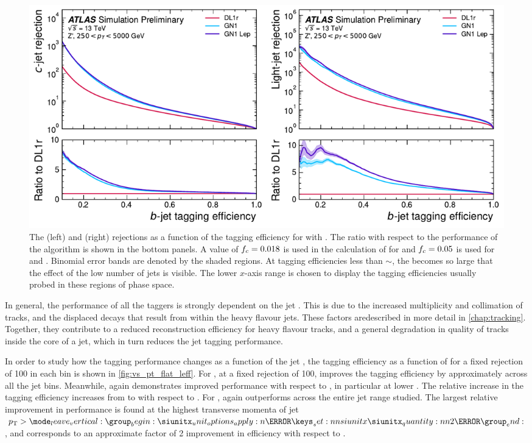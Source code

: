 \begin{figure}[!p]
    \centering
    \includegraphics[width=\textwidth]{chapters/gnn_tagger/figs/results/main/zprime/zprime_roc_btag.pdf}
    \caption{The \cjet (left) and \ljet (right) rejections as a function of the \bjet tagging efficiency for \Zprimejets with \Zprimept.
             The ratio with respect to the performance of the \DLr algorithm is shown in the bottom panels.
             A value of $f_c = 0.018$ is used in the calculation of \Db for \DLr and $f_c = 0.05$ is used for \GNN and \GNNLep.
             Binomial error bands are denoted by the shaded regions.
             At \bjet tagging efficiencies less than $\sim$, the \lrej becomes so large that the effect of the low number of jets is visible.
             The lower $x$-axis range is chosen to display the \bjet tagging efficiencies usually probed in these regions of phase space.}
    \label{fig:zprime_btag_roc}
\end{figure}

In general, the performance of all the taggers is strongly dependent on the jet \pt.
This is due to the increased multiplicity and collimation of tracks, and the displaced decays that result from within the heavy flavour jets.
These factors aredescribed in more detail in \cref{chap:tracking}.
Together, they contribute to a reduced reconstruction efficiency for heavy flavour tracks, and a general degradation in quality of tracks inside the core of a jet, which in turn reduces the jet tagging performance.

In order to study how the tagging performance changes as a function of the jet \pt, the \bjet tagging efficiency as a function of \pt for a fixed \ljet rejection of 100 in each bin is shown in \cref{fig:vs_pt_flat_leff}.
For \ttbarjets, at a fixed \ljet rejection of 100, \GNN improves the \bjet tagging efficiency by approximately  across all the jet \pt bins.
Meanwhile, \GNNLep again demonstrates improved performance with respect to \GNN, in particular at lower \pt.
The relative increase in the \bjet tagging efficiency increases from  to  with respect to \DLr.
For \Zprimejets, \GNN again outperforms \DLr across the entire jet \pt range studied.
The largest relative improvement in performance is found at the highest transverse momenta of jet $\pt > \SI{2}{\TeV}$, and corresponds to an approximate factor of 2 improvement in efficiency with respect to \DLr.


